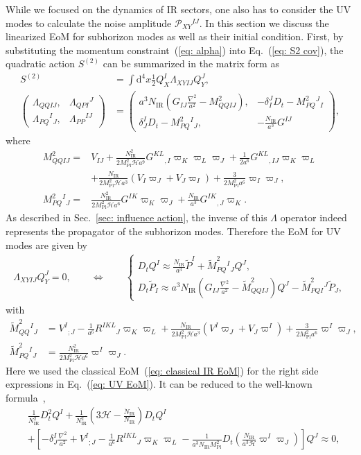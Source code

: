 \documentclass[a4paper,11pt]{article}
\newcommand{\dd}{\mathrm{d}}
\newcommand{\Mpl}{M_\text{Pl}}
\newcommand{\IR}{\text{IR}}
\newcommand{\dps}{\displaystyle}
\newcommand{\calH}{\mathcal{H}}
\newcommand{\calP}{\mathcal{P}}
\newcommand{\bae}[1]{\begin{align} #1 \end{align}}
\newcommand{\bce}[1]{\begin{cases} #1 \end{cases}}
\newcommand{\bpme}[1]{\begin{pmatrix} #1 \end{pmatrix}}
\begin{document}
While we focused on the dynamics of IR sectors, one also has to consider the UV modes to calculate the noise amplitude $\calP_{XY}{}^{IJ}$.
In this section we discuss the linearized EoM for subhorizon modes as well as their initial condition. 
First, by substituting the momentum constraint~(\ref{eq: alpha}) into Eq.~(\ref{eq: S2 cov}), 
the quadratic action $S^{(2)}$ can be summarized in the matrix form as
\bae{
	S^{(2)}&=\int\dd^4x\frac{1}{2}Q_{X}^I\Lambda_{XYIJ}Q_Y^J, \nonumber \\
	\bpme{
		\Lambda_{QQIJ}, & \Lambda_{QPI}{}^J \\
		\Lambda_{PQ}{}^I{}_J, & \Lambda_{PP}{}^{IJ}
	}&=\bpme{
		a^3N_\IR\left(G_{IJ}\frac{\nabla^2}{a^2}-M_{QQIJ}^2\right), & -\delta^J_ID_t-M_{PQ}^2{}^J{}_I \\
		\delta^I_JD_t-M_{PQ}^2{}^I{}_J, & -\frac{N_\IR}{a^3}G^{IJ}
	},
}
where
\bae{
	M^2_{QQIJ}=&V_{IJ}+\frac{N_\IR^2}{2\Mpl^2\calH a^9}G^{KL}{}_{,I}\varpi_K\varpi_L\varpi_J+\frac{1}{2a^6}G^{KL}{}_{,IJ}\varpi_K\varpi_L \nonumber \\
    &+\frac{N_\IR}{2\Mpl^2\calH a^3}(V_I\varpi_J+V_J\varpi_I)+\frac{3}{2\Mpl^2a^6}\varpi_I\varpi_J, \\
	M^2_{PQ}{}^I{}_J=&\frac{N_\IR^2}{2\Mpl^2\calH a^6}G^{IK}\varpi_K\varpi_J+\frac{N_\IR}{a^3}G^{IK}{}_{,J}\varpi_K.
}
As described in Sec.~\ref{sec: influence action}, the inverse of this $\Lambda$ operator indeed represents the propagator of the subhorizon modes.
Therefore the EoM for UV modes are given by
\bae{\label{eq: UV EoM}
	\Lambda_{XYIJ}Q_Y^J=0, \quad\quad \Leftrightarrow \quad\quad 
	\bce{
		\dps
		D_tQ^I\approx\frac{N_\IR}{a^3}\tilde{P}^I+\tilde{M}^2_{PQ}{}^I{}_JQ^J, \\[10pt]
		\dps
		D_t\tilde{P}_I\approx a^3N_\IR\left(G_{IJ}\frac{\nabla^2}{a^2}-\tilde{M}_{QQIJ}^2\right)Q^J-\tilde{M}^2_{PQI}{}^J\tilde{P}_J,
	}
}
with
\bae{
	\tilde{M}^2_{QQ}{}^I{}_J&=V^I{}_{;J}-\frac{1}{a^6}R^{IKL}{}_J\varpi_K\varpi_L+\frac{N_\IR}{2\Mpl^2\calH a^3}(V^I\varpi_J+V_J\varpi^I)+\frac{3}{2\Mpl^2a^6}\varpi^I\varpi_J, \\
    \tilde{M}^2_{PQ}{}^I{}_J&=\frac{N_\IR^2}{2\Mpl^2\calH a^6}\varpi^I\varpi_J.
}
Here we used the classical EoM~(\ref{eq: classical IR EoM}) for the right side expressions in Eq.~(\ref{eq: UV EoM}).
It can be reduced to the well-known formula~\cite{Sasaki:1995aw},
\bae{\label{eq: 2nd order UV EoM}
	&\frac{1}{N_\IR^2}D_t^2Q^I+\frac{1}{N_\IR^2}\left(3\calH-\frac{\dot{N}_\IR}{N_\IR}\right)D_tQ^I \nonumber \\
	&+\left[-\delta^I_J\frac{\nabla^2}{a^2}+V^I{}_{;J}-\frac{1}{a^6}R^{IKL}{}_J\varpi_K\varpi_L
	-\frac{1}{a^3N_\IR\Mpl^2}D_t\left(\frac{N_\IR}{a^3\calH}\varpi^I\varpi_J\right)\right]Q^J\approx0,
}
\end{document}

